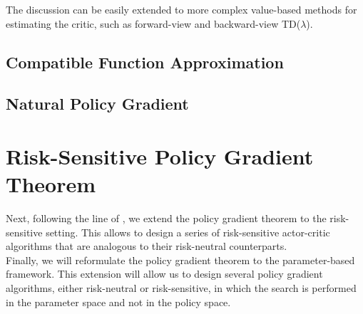 The discussion can be easily extended to more complex value-based methods for estimating the critic, such as forward-view and backward-view TD($\lambda$). 





\subsection{Compatible Function Approximation}


\subsection{Natural Policy Gradient}




\section{Risk-Sensitive Policy Gradient Theorem}
Next, following the line of \cite{prashanth2014actor}, we extend the policy gradient theorem to the risk-sensitive setting. This allows to design a series of risk-sensitive actor-critic algorithms that are analogous to their risk-neutral counterparts.\\
Finally, we will reformulate the policy gradient theorem to the parameter-based framework. This extension will allow us to design several policy gradient algorithms, either risk-neutral or risk-sensitive, in which the search is performed in the parameter space and not in the policy space.   

